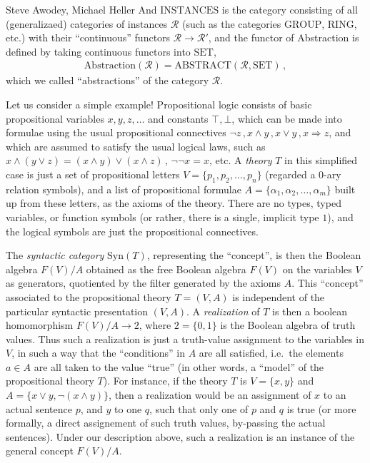 \begin{artengenv2auth}{Steve Awodey, Michael Heller}
And $\mathrm{INSTANCES}$ is the category consisting of all (generalizaed) categories of instances $\mathcal{R}$ (such as the categories $\mathrm{GROUP}$, $\mathrm{RING}$, etc.) with their ``continuous'' functors  $\mathcal{R} \to \mathcal{R'}$, and the functor of Abstraction is defined by taking continuous functors into $\mathrm{SET}$, 
\begin{align*}
\mathrm{Abstraction}(\mathcal{R}) = \mathrm{ABSTRACT}(\mathcal{R}, \mathrm{SET})\,,
\end{align*}
which we called ``abstractions'' of the category $\mathcal{R}$. 

Let us consider a simple example!  Propositional logic consists of basic propositional variables $x, y, z, \dots$ and constants $\top, \bot$, which can be made into formulae using the usual propositional connectives $\neg z\,, x \wedge y\,, x\vee y\,, x\Rightarrow z$, and which are assumed to satisfy the usual logical laws, such as $x \wedge (y\vee z) = (x \wedge y)\vee (x \wedge z)$\,, $\neg\neg x = x$, etc.  A \emph{theory} $T$ in this simplified case is just a set of propositional letters $V = \{p_1, p_2, \dots, p_n\}$ (regarded a 0-ary relation symbols), and a list of propositional formulae $A = \{\alpha_1, \alpha_2, \dots, \alpha_m\}$ built up from these letters, as the axioms of the theory.  There are no types, typed variables, or function symbols (or rather, there is a single, implicit type $1$), and the logical symbols are just the propositional connectives.

The \emph{syntactic category} $\mathrm{Syn}(T)$, representing the ``concept'',  is then the Boolean algebra $F(V)/A$ obtained as the free Boolean algebra $F(V)$ on the variables $V$ as generators, quotiented by the filter generated by the axioms $A$.  This ``concept'' associated to the propositional theory $T = (V,A)$ is independent of the particular syntactic presentation $(V,A)$.  A \emph{realization} of $T$ is then a boolean homomorphism $F(V)/A \to 2$, where $2 = \{0,1\}$ is the Boolean algebra of truth values.  Thus such a realization is just a truth-value assignment to the variables in $V$, in such a way that the ``conditions'' in $A$ are all satisfied, i.e.\ the elements $a\in A$ are all taken to the value ``true'' (in other words, a ``model'' of the propositional theory $T$).  For instance, if the theory $T$ is $V= \{x, y\}$ and $A = \{x\vee y, \neg(x\wedge y)\}$, then a realization would be an assignment of $x$ to an actual sentence $p$, and $y$ to one $q$, such that only one of $p$ and $q$ is true (or more formally, a direct assignement of such truth values, by-passing the actual sentences).  Under our description above, such a realization is an instance of the general concept $F(V)/A$.


\end{artengenv2auth}
